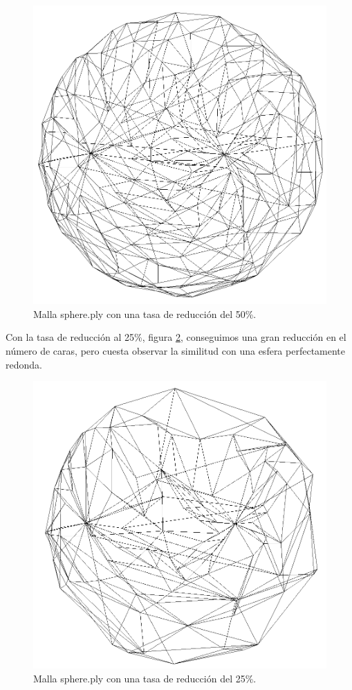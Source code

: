 \begin{figure} %
	\centering
	\includegraphics[scale=0.25]{imagenes/esfera_50.png} 
	\caption{Malla sphere.ply con una tasa de reducción del 50\%.} \label{fig:esfera_50.png}
\end{figure}

Con la tasa de reducción al 25\%, figura \ref{fig:esfera_25.png}, conseguimos una gran reducción en el número de caras, pero cuesta observar la similitud con una esfera perfectamente redonda.

\begin{figure} %
	\centering
	\includegraphics[scale=0.25]{imagenes/esfera_25.png} 
	\caption{Malla sphere.ply con una tasa de reducción del 25\%.} \label{fig:esfera_25.png}
\end{figure}


